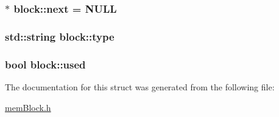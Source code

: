 \subsubsection[{\texorpdfstring{next}{next}}]{$\ast$ block\+::next = N\+U\+LL}\hypertarget{structblock_aa60741c348a6f565b2c1e94df9451d59}{}\label{structblock_aa60741c348a6f565b2c1e94df9451d59}
\subsubsection[{\texorpdfstring{type}{type}}]{\setlength{\rightskip}{0pt plus 5cm}std\+::string block\+::type}\hypertarget{structblock_a37c3af86f231299df298c75962bfa586}{}\label{structblock_a37c3af86f231299df298c75962bfa586}
\subsubsection[{\texorpdfstring{used}{used}}]{\setlength{\rightskip}{0pt plus 5cm}bool block\+::used}\hypertarget{structblock_ac91d285d48c574a14b428b2a07dfbf48}{}\label{structblock_ac91d285d48c574a14b428b2a07dfbf48}


The documentation for this struct was generated from the following file\+:\begin{DoxyCompactItemize}
\item 
\hyperlink{memBlock_8h}{mem\+Block.\+h}\end{DoxyCompactItemize}
